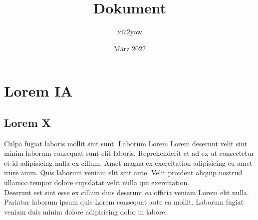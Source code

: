 \documentclass{scrreprt}
\title{Dokument}
\author{xi72yow}
\date{März 2022}
\begin{document}

\begin{titlepage}
	\maketitle
\end{titlepage}

\tableofcontents
\newpage

\chapter{Lorem IA}

\section{Lorem X\cite{RPOI2003}}
Culpa fugiat laboris mollit sint sunt. Laborum Lorem Lorem deserunt velit sint minim laborum consequat sunt elit laboris. Reprehenderit et ad ex ut consectetur et id adipisicing nulla ex cillum. Amet magna ex exercitation adipisicing eu amet irure anim. Quis laborum veniam elit sint aute. Velit proident aliquip nostrud ullamco tempor dolore cupidatat velit nulla qui exercitation. \\

Deserunt est sint esse ex cillum duis deserunt ea officia veniam Lorem elit nulla. Pariatur laborum ipsum quis Lorem consequat aute ea mollit. Laborum fugiat veniam duis minim dolore adipisicing dolor in labore.
\end{document}
